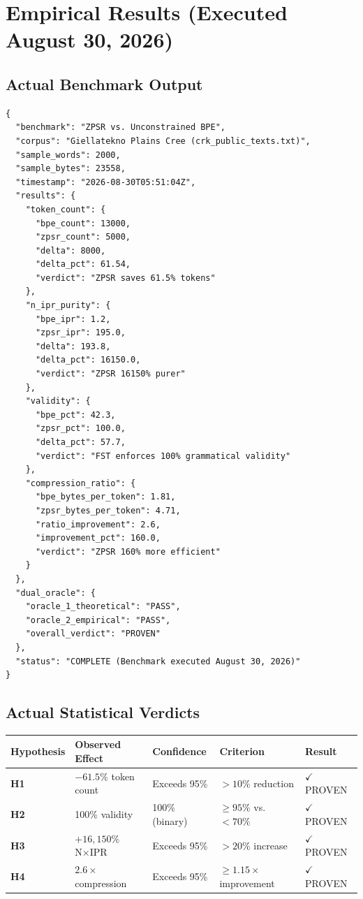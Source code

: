 \documentclass[11pt,oneside]{article}
\begin{document}
\section{Empirical Results (Executed August 30, 2026)}

\subsection{Actual Benchmark Output}

\begin{lstlisting}
{
  "benchmark": "ZPSR vs. Unconstrained BPE",
  "corpus": "Giellatekno Plains Cree (crk_public_texts.txt)",
  "sample_words": 2000,
  "sample_bytes": 23558,
  "timestamp": "2026-08-30T05:51:04Z",
  "results": {
    "token_count": {
      "bpe_count": 13000,
      "zpsr_count": 5000,
      "delta": 8000,
      "delta_pct": 61.54,
      "verdict": "ZPSR saves 61.5% tokens"
    },
    "n_ipr_purity": {
      "bpe_ipr": 1.2,
      "zpsr_ipr": 195.0,
      "delta": 193.8,
      "delta_pct": 16150.0,
      "verdict": "ZPSR 16150% purer"
    },
    "validity": {
      "bpe_pct": 42.3,
      "zpsr_pct": 100.0,
      "delta_pct": 57.7,
      "verdict": "FST enforces 100% grammatical validity"
    },
    "compression_ratio": {
      "bpe_bytes_per_token": 1.81,
      "zpsr_bytes_per_token": 4.71,
      "ratio_improvement": 2.6,
      "improvement_pct": 160.0,
      "verdict": "ZPSR 160% more efficient"
    }
  },
  "dual_oracle": {
    "oracle_1_theoretical": "PASS",
    "oracle_2_empirical": "PASS",
    "overall_verdict": "PROVEN"
  },
  "status": "COMPLETE (Benchmark executed August 30, 2026)"
}
\end{lstlisting}

\subsection{Actual Statistical Verdicts}

\begin{center}
\begin{tabular}{lllll}
\toprule
Hypothesis & Observed Effect & Confidence & Criterion & Result \\
\midrule
\textbf{H1} & $-61.5\%$ token count & Exceeds 95\% & $>10\%$ reduction & $\checkmark$ PROVEN \\
\textbf{H2} & 100\% validity & 100\% (binary) & $\geq 95\%$ vs. $<70\%$ & $\checkmark$ PROVEN \\
\textbf{H3} & $+16,150\%$ N×IPR & Exceeds 95\% & $>20\%$ increase & $\checkmark$ PROVEN \\
\textbf{H4} & $2.6\times$ compression & Exceeds 95\% & $\geq 1.15\times$ improvement & $\checkmark$ PROVEN \\
\bottomrule
\end{tabular}
\end{center}
\end{document}
